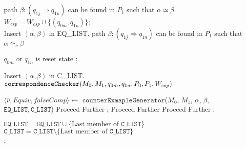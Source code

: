  	\begin{algorithm}[!t]
  \scriptsize
 		{	\uIf
 			{
 				path $\beta:(q_{1j}\Rightarrow q_{1n})$ can be found in
 				$P_1$ such that $\alpha\simeq\beta$
 			} 
 			{
 				$W_{csp}=W_{csp}\cup \{(q_{0m},q_{1n})\}$;\\ 
 				Insert $(\alpha,\beta)$ in EQ\_LIST.
 			}
 			\uElseIf
 			{
 				path $\beta:(q_{1j}\Rightarrow q_{1n})$ can be found in $P_1$
 				such that $\alpha\simeq_c\beta$
 			} 
 			{
 				\uIf
 				{
 					$q_{0m}$ or $q_{1n}$ is reset state
 				} 
 				{
 					; 
 				}			
 				\Else 
 				{
 					Insert $(\alpha,\beta)$ in C\_LIST.\\
 					$\mathtt{correspondenceChecker}(M_0,M_1,q_{0m},q_{1n},\newline P_0,P_1, 
 					W_{csp})$\;
 						
 				}	
 			} 
 			\Else 
 			{ 
 				$\langle\bar{v},Equiv,falseComp\rangle$$\leftarrow$ 
 				$\mathtt{counterExmapleGenerator}$($M_0$, $M_1$, $\alpha$,  $\beta$, 
 			 $\mathtt{EQ\_LIST, C\_LIST}$)\label{Line:counter}\;
 			 {Proceed Further  }
 			 {	; }
 				{Proceed Further } 
 				\label{step:fail}
 				{Proceed Further } 
 				\label{step:fail}
 			\Else	
 			 {; }
 			}
 					
 		} 
  $\mathtt{EQ\_LIST}=\mathtt{EQ\_LIST}\cup\{\text{Last member of }\mathtt{C\_LIST\}}$\\
  $\mathtt{C\_LIST}=\mathtt{C\_LIST}\setminus\{\text{Last member of }\mathtt{C\_LIST}\}$\\ 
 		; 
 	 \caption{$\mathtt{correspondenceChecker}(M_{0},M_{1},q_{0i},q_{1j},\newline,
 	 P_0,P_1,W_{csp})$}
 		\label{Algo:correspondenceChecker} 
 	\end{algorithm}
